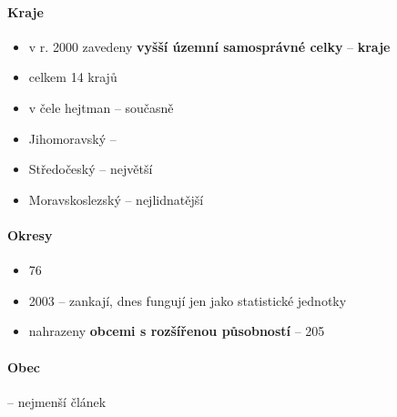 \paragraph{Kraje}
\begin{itemize}
\item v r. 2000 zavedeny \textbf{vyšší územní samosprávné celky} -- \textbf{kraje}
\item celkem 14 krajů
\item v čele hejtman -- současně
\item Jihomoravský -- 
\item Středočeský -- největší
\item Moravskoslezský -- nejlidnatější
\end{itemize}

\paragraph{Okresy}
\begin{itemize}
\item 76
\item 2003 -- zankají, dnes fungují jen jako statistické jednotky
\item nahrazeny \textbf{obcemi s rozšířenou působností} -- 205
\end{itemize}

\paragraph{Obec} -- nejmenší článek

